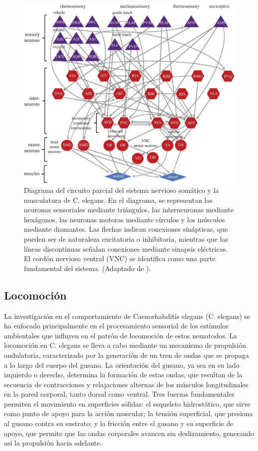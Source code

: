  \begin{figure}[h!]
	\centering\includegraphics[width=\imsize]{rstb20140212f02.jpg}
	\caption[ Diagrama del circuito parcial del sistema nervioso somático y la musculatura de C. elegans. ]{ Diagrama del circuito parcial del sistema nervioso somático y la musculatura de C. elegans.  En el diagrama, se representan las neuronas sensoriales mediante triángulos, las interneuronas mediante hexágonos, las neuronas motoras mediante círculos y los músculos mediante diamantes. Las flechas indican conexiones sinápticas, que pueden ser de naturaleza excitatoria o inhibitoria, mientras que las líneas discontinuas señalan conexiones mediante sinapsis eléctricas. El cordón nervioso ventral (VNC) se identifica como una parte fundamental del sistema.  (Adaptado de \protect\cite{shibue_deconvolution_2020}).}\label{fig:sistema_nervioso2}
\end{figure}


\subsection{Locomoción}

La investigación en el comportamiento de Caenorhabditis elegans (C. elegans) se ha enfocado principalmente en el procesamiento sensorial de los estímulos ambientales que influyen en el patrón de locomoción de estos nematodos. La locomoción en C. elegans se lleva a cabo mediante un mecanismo de propulsión ondulatoria, caracterizado por la generación de un tren de ondas que se propaga a lo largo del cuerpo del gusano. La orientación del gusano, ya sea en su lado izquierdo o derecho, determina la formación de estas ondas, que resultan de la secuencia de contracciones y relajaciones alternas de los músculos longitudinales en la pared corporal, tanto dorsal como ventral. Tres fuerzas fundamentales permiten el movimiento en superficies sólidas: el esqueleto hidrostático, que sirve como punto de apoyo para la acción muscular; la tensión superficial, que presiona al gusano contra su sustrato; y la fricción entre el gusano y su superficie de apoyo, que permite que las ondas corporales avancen sin deslizamiento, generando así la propulsión hacia adelante.

